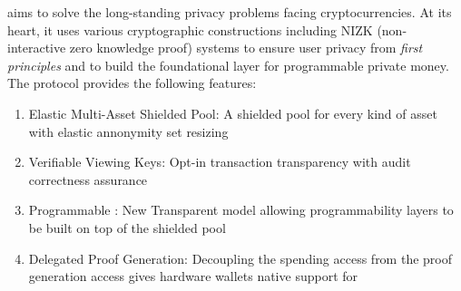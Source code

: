 
\MantaPay{} aims to solve the long-standing privacy problems facing cryptocurrencies. At its heart, it uses various cryptographic constructions including NIZK (non-interactive zero knowledge proof) systems to ensure user privacy from \emph{first principles} and to build the foundational layer for programmable private money. The \MantaPay{} protocol provides the following features:

\begin{enumerate}
    \item Elastic Multi-Asset Shielded Pool: A shielded pool for every kind of asset with elastic annonymity set resizing
    \item Verifiable Viewing Keys: Opt-in transaction transparency with audit correctness assurance
    \item Programmable : New Transparent \UTXO{} model allowing programmability layers to be built on top of the shielded pool
    \item Delegated Proof Generation: Decoupling the spending access from the proof generation access gives hardware wallets native support for 
\end{enumerate}
